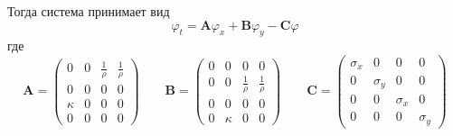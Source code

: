 Тогда система принимает вид
\begin{equation}
	\varphi_t = \pmb{A} \varphi_x +  \pmb{B} \varphi_y - \pmb{C} \varphi
\end{equation}
где 
\begin{equation}
	\pmb{A} = 
	\begin{pmatrix}
    	0 & 0 & \frac{1}{\rho} & \frac{1}{\rho} \\
    	0 & 0 & 0 & 0 \\
        \kappa & 0 & 0 & 0 \\
    	0 & 0 & 0 & 0
	\end{pmatrix} \qquad
	\pmb{B} = 
	\begin{pmatrix}
    	0 & 0 & 0 & 0 \\
        0 & 0 & \frac{1}{\rho} & \frac{1}{\rho} \\
    	0 & 0 & 0 & 0 \\
        0 & \kappa  & 0 & 0
	\end{pmatrix} \qquad
	\pmb{C} = 
	\begin{pmatrix}
    	\sigma_x & 0 & 0 & 0 \\
    	0 & \sigma_y & 0 & 0 \\
        0 & 0 & \sigma_x & 0 \\
    	0 & 0 & 0 & \sigma_y
	\end{pmatrix}
\end{equation}

